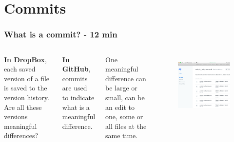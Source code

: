 \documentclass[aspectratio=169]{beamer} %
\begin{document}
\section{Commits}

\begin{frame}
	\frametitle{What is a commit? - 12 min}

	\begin{columns}[c] 
	
		\textbf{In DropBox}, each saved version of a file is saved to the version history. Are all these versions meaningful differences? 
		
		\vspace{.35cm}
		
		\textbf{In GitHub}, commits are used to indicate what is a meaningful difference. 
		
		\vspace{.35cm}
		
		One meaningful difference can be large or small, can be an edit to one, some or all files at the same time.
		
		\begin{figure}
			\centering
			\includegraphics[width=1\linewidth]{../../Common-Resources/img/dropbox_versioncontrol}
			\label{fig:dropboxversioncontrol}
		\end{figure}
		
	\end{columns}
\end{frame}
\end{document}
